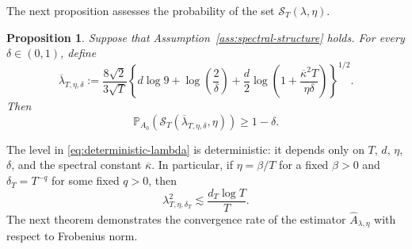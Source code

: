 \documentclass[11pt]{article}
\newtheorem{proposition}[theorem]{Proposition}
\begin{document}
The next proposition assesses the probability of the set 
$\mathcal S_T(\lambda,\eta)$.
\begin{proposition}
\label{prop:deterministic-score-level}
Suppose that Assumption~\ref{ass:spectral-structure} holds. For every
$\delta\in(0,1)$, define
\begin{equation}
    \overline\lambda_{T,\eta,\delta}
    :=
    \frac{8\sqrt{2}}{3\sqrt{T}}
    \left\{
        d\log 9
        +\log\!\left(\frac{2}{\delta}\right)
        +\frac{d}{2}\log\!\left(
            1+\frac{\overline\kappa^2T}{\eta\delta}
        \right)
    \right\}^{1/2}.
\label{eq:deterministic-lambda}
\end{equation}
Then
\begin{equation}
    \mathbb P_{A_0}\!\left(
        \mathcal S_T(\overline\lambda_{T,\eta,\delta},\eta)
    \right)
    \geq 1-\delta.
\label{eq:deterministic-score-probability}
\end{equation}
\end{proposition}
The level in \eqref{eq:deterministic-lambda} is deterministic: it depends only
on $T$, $d$, $\eta$, $\delta$, and the spectral constant
$\overline\kappa$. In particular, if $\eta=\beta/T$ for a fixed $\beta>0$ and
$\delta_T=T^{-q}$ for some fixed $q>0$, then
\[
    \lambda_{T,\eta,\delta_T}^2
    \lesssim
    \frac{d_T\log T}{T}.
\]
The next theorem demonstrates the convergence rate of the estimator $\widehat A_{\lambda,\eta}$ with respect to Frobenius norm. 
\end{document}
